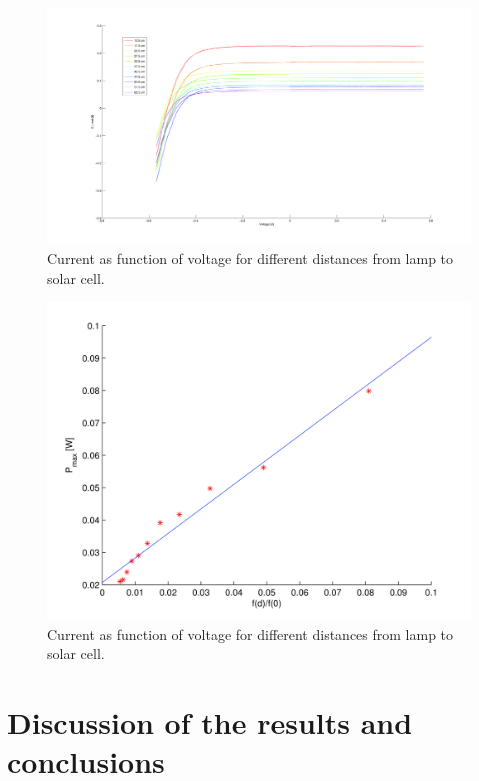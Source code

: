 \documentclass[a4paper]{article}
\begin{document}
\begin{figure}[h!]
  \begin{center}
    \includegraphics[scale=0.2]{IvsU}
  \end{center}
  \caption{Current as function of voltage for different distances from lamp to solar cell.}
  \label{ivsu}
\end{figure}

\begin{figure}[h!]
  \begin{center}
    \includegraphics[scale=0.3]{pmaxvsf}
  \end{center}
  \caption{Current as function of voltage for different distances from lamp to solar cell.}
  \label{pmaxvsf}
\end{figure}
\fi

\section{Discussion of the results and conclusions}
\end{document}
